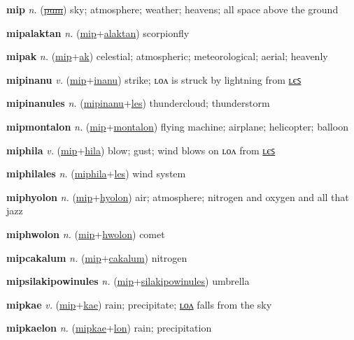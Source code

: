 \textbf{\hypertarget{mip}{mip}} \textit{n.} (\hyperlink{pum}{\sout{pum}})
sky; atmosphere; weather; heavens; all space above the ground

\textbf{\hypertarget{mipalaktan}{mipalaktan}} \textit{n.} (\hyperlink{mip}{mip}+\allowbreak \hyperlink{alaktan}{alaktan})
scorpionfly

\textbf{\hypertarget{mipak}{mipak}} \textit{n.} (\hyperlink{mip}{mip}+\allowbreak \hyperlink{ak}{ak})
celestial; atmospheric; meteorological; aerial; heavenly

\textbf{\hypertarget{mipinanu}{mipinanu}} \textit{v.} (\hyperlink{mip}{mip}+\allowbreak \hyperlink{inanu}{inanu})
strike; ʟᴏᴧ is struck by lightning from \hyperlink{mipinanules}{ʟєꜱ}

\textbf{\hypertarget{mipinanules}{mipinanules}} \textit{n.} (\hyperlink{mipinanu}{mipinanu}+\allowbreak \hyperlink{les}{les})
thundercloud; thunderstorm

\textbf{\hypertarget{mipmontalon}{mipmontalon}} \textit{n.} (\hyperlink{mip}{mip}+\allowbreak \hyperlink{montalon}{montalon})
flying machine; airplane; helicopter; balloon

\textbf{\hypertarget{miphila}{miphila}} \textit{v.} (\hyperlink{mip}{mip}+\allowbreak \hyperlink{hila}{hila})
blow; gust; wind blows on ʟᴏᴧ from \hyperlink{miphilales}{ʟєꜱ}

\textbf{\hypertarget{miphilales}{miphilales}} \textit{n.} (\hyperlink{miphila}{miphila}+\allowbreak \hyperlink{les}{les})
wind system

\textbf{\hypertarget{miphyolon}{miphyolon}} \textit{n.} (\hyperlink{mip}{mip}+\allowbreak \hyperlink{hyolon}{hyolon})
air; atmosphere; nitrogen and oxygen and all that jazz

\textbf{\hypertarget{miphwolon}{miphwolon}} \textit{n.} (\hyperlink{mip}{mip}+\allowbreak \hyperlink{hwolon}{hwolon})
comet

\textbf{\hypertarget{mipcakalum}{mipcakalum}} \textit{n.} (\hyperlink{mip}{mip}+\allowbreak \hyperlink{cakalum}{cakalum})
nitrogen

\textbf{\hypertarget{mipsilakipowinules}{mipsilakipowinules}} \textit{n.} (\hyperlink{mip}{mip}+\allowbreak \hyperlink{silakipowinules}{silakipowinules})
umbrella

\textbf{\hypertarget{mipkae}{mipkae}} \textit{v.} (\hyperlink{mip}{mip}+\allowbreak \hyperlink{kae}{kae})
rain; precipitate; \hyperlink{mipkaelon}{ʟᴏᴧ} falls from the sky

\textbf{\hypertarget{mipkaelon}{mipkaelon}} \textit{n.} (\hyperlink{mipkae}{mipkae}+\allowbreak \hyperlink{lon}{lon})
rain; precipitation

